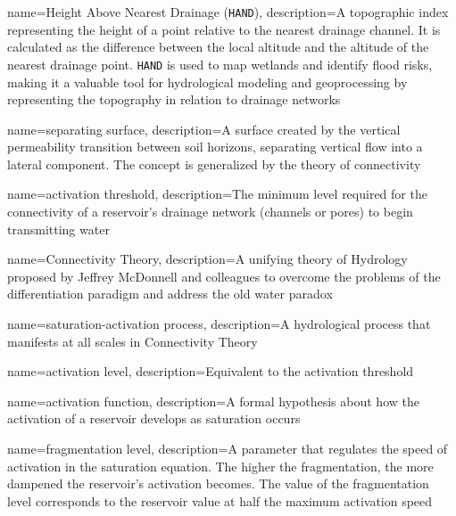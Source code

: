 {
    name=Height Above Nearest Drainage (\texttt{HAND}),
    description={A topographic index representing the height of a point relative to the nearest drainage channel. It is calculated as the difference between the local altitude and the altitude of the nearest drainage point. \texttt{HAND} is used to map wetlands and identify flood risks, making it a valuable tool for hydrological modeling and geoprocessing by representing the topography in relation to drainage networks}
}

{
    name=separating surface,
    description={A surface created by the vertical permeability transition between soil horizons, separating vertical flow into a lateral component. The concept is generalized by the theory of connectivity}
}

{
    name=activation threshold,
    description={The minimum level required for the connectivity of a reservoir's drainage network (channels or pores) to begin transmitting water}
}

{
    name=Connectivity Theory,
    description={A unifying theory of Hydrology proposed by Jeffrey McDonnell and colleagues to overcome the problems of the differentiation paradigm and address the old water paradox}
}

{
    name=saturation-activation process,
    description={A hydrological process that manifests at all scales in Connectivity Theory}
}

{
    name=activation level,
    description={Equivalent to the activation threshold}
}

{
    name=activation function,
    description={A formal hypothesis about how the activation of a reservoir develops as saturation occurs}
}

{
    name=fragmentation level,
    description={A parameter that regulates the speed of activation in the saturation equation. The higher the fragmentation, the more dampened the reservoir's activation becomes. The value of the fragmentation level corresponds to the reservoir value at half the maximum activation speed}
}